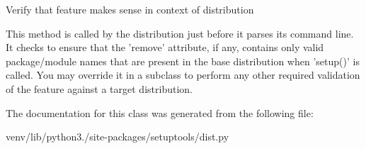 \begin{DoxyVerb}Verify that feature makes sense in context of distribution

This method is called by the distribution just before it parses its
command line.  It checks to ensure that the 'remove' attribute, if any,
contains only valid package/module names that are present in the base
distribution when 'setup()' is called.  You may override it in a
subclass to perform any other required validation of the feature
against a target distribution.
\end{DoxyVerb}
 

The documentation for this class was generated from the following file\+:\begin{DoxyCompactItemize}
\item 
venv/lib/python3./site-\/packages/setuptools/dist.\+py\end{DoxyCompactItemize}
